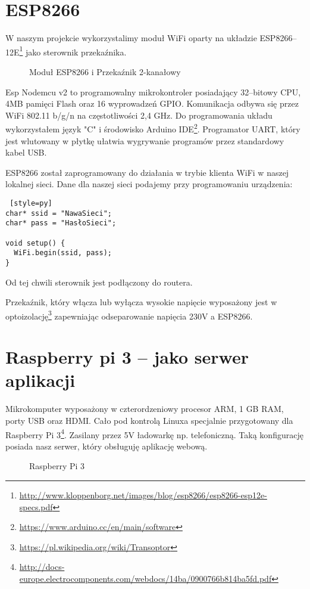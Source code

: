 \documentclass{xmgr}
\begin{document}
\section{ESP8266}
W naszym projekcie wykorzystalimy moduł WiFi oparty na układzie ESP8266--12E\cite{esp:2015:datasheet}\footnote{\url{http://www.kloppenborg.net/images/blog/esp8266/esp8266-esp12e-specs.pdf}} jako sterownik przekaźnika. 
\hspace{2cm}
\begin{figure}[h]
\centering
{}
\quad
{}
\quad
\caption{Moduł ESP8266 i Przekaźnik 2-kanałowy}
\end{figure}

Esp Nodemcu v2 to programowalny mikrokontroler posiadający 32--bitowy CPU, 4MB pamięci Flash oraz 16 wyprowadzeń GPIO. Komunikacja odbywa się przez WiFi 802.11 b/g/n na częstotliwości 2,4 GHz. Do programowania układu wykorzystałem język "C" i środowisko Arduino IDE\footnote{\url{https://www.arduino.cc/en/main/software}}. Programator UART, który jest wlutowany w płytkę ułatwia wygrywanie programów przez standardowy kabel USB. 

ESP8266 został zaprogramowany do działania w trybie klienta WiFi w naszej lokalnej sieci. Dane dla naszej sieci podajemy przy programowaniu urządzenia:
\begin{lstlisting} [style=py] 
char* ssid = "NawaSieci";
char* pass = "HasłoSieci";

void setup() {
  WiFi.begin(ssid, pass);
}
\end{lstlisting}
Od tej chwili sterownik jest podłączony do routera.

Przekaźnik, który włącza lub wyłącza wysokie napięcie wyposażony jest w optoizolację\footnote{\url{https://pl.wikipedia.org/wiki/Transoptor}} zapewniając odseparowanie napięcia 230V a ESP8266. 

\section{Raspberry pi 3 -- jako serwer aplikacji}
Mikrokomputer wyposażony w czterordzeniowy procesor ARM, 1 GB RAM, porty USB oraz HDMI. Cało pod kontrolą Linuxa specjalnie przygotowany dla Raspberry Pi 3\cite{rpi3:2016:datasheet}\footnote{\url{http://docs-europe.electrocomponents.com/webdocs/14ba/0900766b814ba5fd.pdf}}. Zasilany przez 5V ładowarkę np. telefoniczną. Taką konfigurację posiada nasz serwer, który obsługuję  aplikację webową.
\hspace{2cm}
\begin{figure}[h]
\centering
{}
\quad
\caption{Raspberry Pi 3}
\end{figure}
\end{document}
